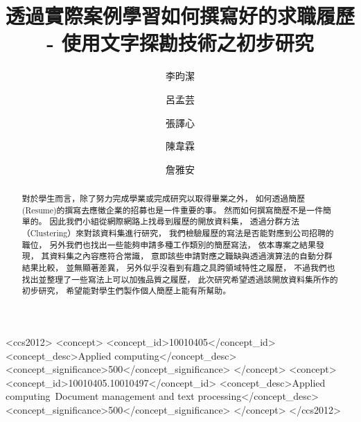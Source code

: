 \documentclass[acmsmall]{acmart}
\begin{document}
\title{透過實際案例學習如何撰寫好的求職履歷 - 使用文字探勘技術之初步研究}


\author{李昀潔}
\author{呂孟芸}
\author{張譯心}
\author{陳韋霖}
\author{詹雅安}


\begin{abstract}
    對於學生而言，除了努力完成學業或完成研究以取得畢業之外，
    如何透過簡歷(Resume)的撰寫去應徵企業的招募也是一件重要的事。
    然而如何撰寫簡歷不是一件簡單的。
    因此我們小組從網際網路上找尋到履歷的開放資料集，
    透過分群方法（Clustering）來對該資料集進行研究，
    我們檢驗履歷的寫法是否能對應到公司招聘的職位，
    另外我們也找出一些能夠申請多種工作類別的簡歷寫法，
    依本專案之結果發現，
    其資料集之內容應符合常識，
    意即該些申請對應之職缺與透過演算法的自動分群結果比較，
    並無顯著差異，
    另外似乎沒看到有趣之具跨領域特性之履歷，
    不過我們也找出並整理了一些寫法上可以加強品質之履歷，
    此次研究希望透過該開放資料集所作的初步研究，
    希望能對學生們製作個人簡歷上能有所幫助。
\end{abstract}


\begin{CCSXML}
<ccs2012>
   <concept>
       <concept_id>10010405</concept_id>
       <concept_desc>Applied computing</concept_desc>
       <concept_significance>500</concept_significance>
       </concept>
   <concept>
       <concept_id>10010405.10010497</concept_id>
       <concept_desc>Applied computing~Document management and text processing</concept_desc>
       <concept_significance>500</concept_significance>
       </concept>
 </ccs2012>
\end{CCSXML}
\end{document}
